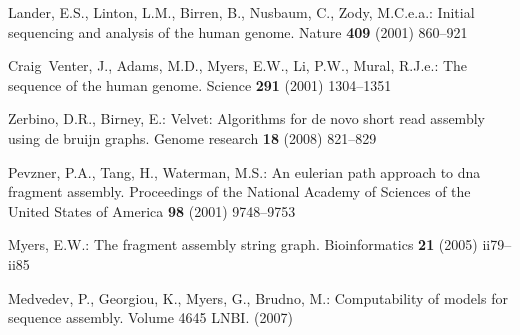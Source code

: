 \documentclass[runningheads]{llncs}
\begin{document}

\begin{thebibliography}{1}

Lander, E.S., Linton, L.M., Birren, B., Nusbaum, C., Zody, M.C.e.a.:
\newblock Initial sequencing and analysis of the human genome.
\newblock Nature \textbf{409} (2001)  860--921

Craig~Venter, J., Adams, M.D., Myers, E.W., Li, P.W., Mural, R.J.e.:
\newblock The sequence of the human genome.
\newblock Science \textbf{291} (2001)  1304--1351

Zerbino, D.R., Birney, E.:
\newblock Velvet: Algorithms for de novo short read assembly using de bruijn
  graphs.
\newblock Genome research \textbf{18} (2008)  821--829

Pevzner, P.A., Tang, H., Waterman, M.S.:
\newblock An eulerian path approach to dna fragment assembly.
\newblock Proceedings of the National Academy of Sciences of the United States
  of America \textbf{98} (2001)  9748--9753

Myers, E.W.:
\newblock The fragment assembly string graph.
\newblock Bioinformatics \textbf{21} (2005)  ii79--ii85

Medvedev, P., Georgiou, K., Myers, G., Brudno, M.:
\newblock Computability of models for sequence assembly. Volume 4645 LNBI.
\newblock (2007)

\end{thebibliography}
\end{document}
